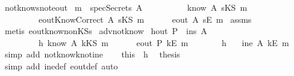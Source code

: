 \begin{isabellebody}
\endisatagproof
{\isafoldproof}%
%
\isadelimproof
\isanewline
%
\endisadelimproof
\isanewline
{}\isamarkupfalse%
\ not{\isacharunderscore}know{\isacharunderscore}s{\isacharunderscore}not{\isacharunderscore}eout{\isacharcolon}\isanewline
{}\ {\isachardoublequoteopen}m\ {\isasymnotin}\ specSecrets\ A{\isachardoublequoteclose}\isanewline
\ \ \ \ \ \ \ \ \ {\isachardoublequoteopen}{\isasymnot}\ know\ A\ {\isacharparenleft}sKS\ m{\isacharparenright}{\isachardoublequoteclose}\isanewline
\ \ \ \ \ \ \ \ \ {\isachardoublequoteopen}eoutKnowCorrect\ A\ {\isacharparenleft}sKS\ m{\isacharparenright}{\isachardoublequoteclose}\isanewline
{}\ \ \ \ \ {\isachardoublequoteopen}{\isasymnot}\ eout\ A\ {\isacharparenleft}sE\ m{\isacharparenright}{\isachardoublequoteclose}\isanewline
%
\isadelimproof
%
\endisadelimproof
%
\isatagproof
{}\isamarkupfalse%
\ assms\ \isamarkupfalse%
\ {\isacharparenleft}metis\ eout{\isacharunderscore}know{\isacharunderscore}nonKS{\isacharunderscore}s{\isacharparenright}%
\endisatagproof
{\isafoldproof}%
%
\isadelimproof
\isanewline
%
\endisadelimproof
\isanewline
{}\isamarkupfalse%
\ adv{\isacharunderscore}not{\isacharunderscore}know{}{\isacharcolon}\isanewline
{}\ h{}{\isacharcolon}{\isachardoublequoteopen}out\ P\ {\isasymsubseteq}\ ins\ A{\isachardoublequoteclose}\isanewline
\ \ \ \ \ \ \ \ \ h{}{\isacharcolon}{\isachardoublequoteopen}{\isasymnot}\ know\ A\ {\isacharparenleft}kKS\ m{\isacharparenright}{\isachardoublequoteclose}\ \isanewline
{}\ \ \ \ {\isachardoublequoteopen}{\isasymnot}\ eout\ P\ {\isacharparenleft}kE\ m{\isacharparenright}{\isachardoublequoteclose}\ \isanewline
%
\isadelimproof
%
\endisadelimproof
%
\isatagproof
{}\isamarkupfalse%
\ {\isacharminus}\ \isanewline
\ \ \isamarkupfalse%
\ h{}\ \isamarkupfalse%
\ {\isachardoublequoteopen}{\isasymnot}\ ine\ A\ {\isacharparenleft}kE\ m{\isacharparenright}{\isachardoublequoteclose}\ \isamarkupfalse%
\ {\isacharparenleft}simp\ add{\isacharcolon}\ not{\isacharunderscore}know{\isacharunderscore}k{\isacharunderscore}not{\isacharunderscore}ine{\isacharparenright}\isanewline
\ \ \isamarkupfalse%
\ this\ \ h{}\ \isamarkupfalse%
\ {\isacharquery}thesis\ \isamarkupfalse%
\ {\isacharparenleft}simp\ add{\isacharcolon}\ ine{\isacharunderscore}def\ eout{\isacharunderscore}def{\isacharcomma}\ auto{\isacharparenright}\isanewline

\end{isabellebody}
